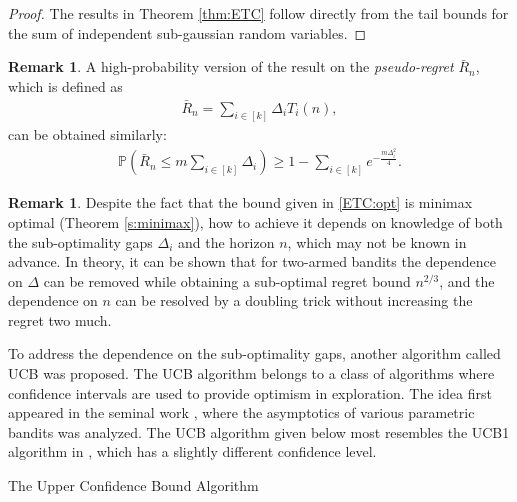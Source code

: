 \documentclass[letterpaper,11pt,openright,openany]{book}
\numberwithin{equation}{section}
\theoremstyle{plain}
\theoremstyle{definition}
\newtheorem{Rem}[Th]{Remark}
\def\P{{\mathbb P}}
\begin{document}
\begin{proof}
The results in Theorem \ref{thm:ETC} follow directly from the tail bounds for the sum of independent sub-gaussian random variables. 
\end{proof}

\begin{Rem}
A high-probability version of the result on the \emph{pseudo-regret} $\bar{R}_n$, which is defined as 
\begin{align*}
\bar{R}_n = \sum_{i\in [k]}\Delta_i T_i(n),
\end{align*}
can be obtained similarly:
\begin{align*}
\P\left(\bar{R}_n\leq m\sum_{i\in [k]}\Delta_i\right)\geq 1-\sum_{i\in [k]}e^{-\frac{m\Delta_i^2}{4}}. 
\end{align*}
\end{Rem}

\begin{Rem}
Despite the fact that the bound given in \eqref{ETC:opt} is minimax optimal (Theorem \ref{s:minimax}), how to achieve it depends on knowledge of both the sub-optimality gaps $\Delta_i$ and the horizon $n$, which may not be known in advance. In theory, it can be shown that for two-armed bandits the dependence on $\Delta$ can be removed while obtaining a sub-optimal regret bound $n^{2/3}$, and the dependence on $n$ can be resolved by a doubling trick without increasing the regret two much. 
\end{Rem} 

To address the dependence on the sub-optimality gaps, another algorithm called UCB was proposed. The UCB algorithm belongs to a class of algorithms where confidence intervals are used to provide optimism in exploration. The idea first appeared in the seminal work \cite{Lai_1985}, where the asymptotics of various parametric bandits was analyzed. The UCB algorithm given below most resembles the UCB1 algorithm in \cite{auer2002finite}, which has a slightly different confidence level.  


\begin{algorithm}[H]
\begin{algorithmic}[1]
\ENDWHILE
\end{algorithmic}
\caption{The Upper Confidence Bound Algorithm} 
\label{alg:UCB}
\end{algorithm}
\end{document}
